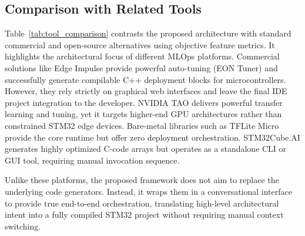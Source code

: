 \subsection{Comparison with Related Tools}

Table~\ref{tab:tool_comparison} contrasts the proposed architecture with standard commercial and open-source alternatives using objective feature metrics. It highlights the architectural focus of different MLOps platforms. Commercial solutions like Edge Impulse provide powerful auto-tuning (EON Tuner) and successfully generate compilable C++ deployment blocks for microcontrollers. However, they rely strictly on graphical web interfaces and leave the final IDE project integration to the developer. NVIDIA TAO delivers powerful transfer learning and tuning, yet it targets higher-end GPU architectures rather than constrained STM32 edge devices. Bare-metal libraries such as TFLite Micro provide the core runtime but offer zero deployment orchestration. STM32Cube.AI generates highly optimized C-code arrays but operates as a standalone CLI or GUI tool, requiring manual invocation sequence.

Unlike these platforms, the proposed framework does not aim to replace the underlying code generators. Instead, it wraps them in a conversational interface to provide true end-to-end orchestration, translating high-level architectural intent into a fully compiled STM32 project without requiring manual context switching.

\begin{table}[h!]
    \centering
    \caption{Automation Coverage Comparison}
    \label{tab:tool_comparison}
    \small
\end{table}
